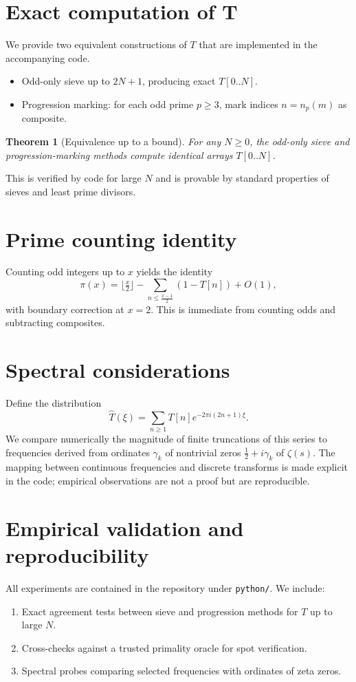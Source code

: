 \documentclass[11pt]{article}
\newtheorem{theorem}{Theorem}
\theoremstyle{definition}
\theoremstyle{remark}
\begin{document}
\section{Exact computation of T}
We provide two equivalent constructions of \(T\) that are implemented in the accompanying code.
\begin{itemize}[leftmargin=*]
  \item Odd-only sieve up to \(2N+1\), producing exact \(T[0..N]\).
  \item Progression marking: for each odd prime \(p\ge3\), mark indices \(n=n_p(m)\) as composite.
\end{itemize}
\begin{theorem}[Equivalence up to a bound]
For any \(N\ge 0\), the odd-only sieve and progression-marking methods compute identical arrays \(T[0..N]\).
\end{theorem}
\noindent This is verified by code for large \(N\) and is provable by standard properties of sieves and least prime divisors.

\section{Prime counting identity}
Counting odd integers up to \(x\) yields the identity
\[
\pi(x) = \Big\lfloor \tfrac{x}{2} \Big\rfloor - \sum_{n\le \frac{x-1}{2}} (1-T[n]) + O(1),
\]
with boundary correction at \(x=2\). This is immediate from counting odds and subtracting composites.

\section{Spectral considerations}
Define the distribution
\[
\widehat{T}(\xi) = \sum_{n\ge1} T[n] e^{-2\pi i (2n+1)\xi}.
\]
We compare numerically the magnitude of finite truncations of this series to frequencies derived from ordinates \(\gamma_k\) of nontrivial zeros \(\tfrac{1}{2}+i\gamma_k\) of \(\zeta(s)\). The mapping between continuous frequencies and discrete transforms is made explicit in the code; empirical observations are not a proof but are reproducible.

\section{Empirical validation and reproducibility}
All experiments are contained in the repository under \texttt{python/}. We include:
\begin{enumerate}[leftmargin=*]
  \item Exact agreement tests between sieve and progression methods for \(T\) up to large \(N\).
  \item Cross-checks against a trusted primality oracle for spot verification.
  \item Spectral probes comparing selected frequencies with ordinates of zeta zeros.
\end{enumerate}
\end{document}
